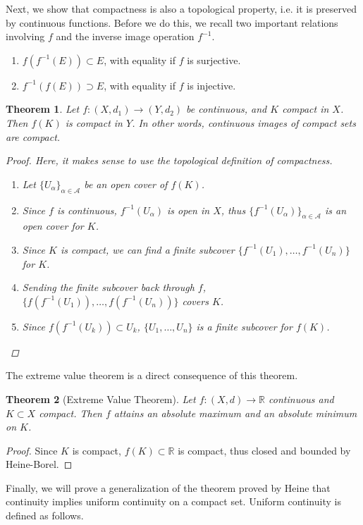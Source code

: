 \documentclass[12pt]{amsart}         %
\newtheorem{theorem}{Theorem}[section]
\theoremstyle{remark}
\newcommand{\R}{\mathbb{R}}
\begin{document}
Next, we show that compactness is also a topological property, i.e. it is preserved by continuous functions. Before we do this, we recall two important relations involving $f$ and the inverse image operation $f^{-1}$.
\begin{enumerate}
    \item $f(f^{-1}(E)) \subset E$, with equality if $f$ is surjective.
    \item $f^{-1}(f(E)) \supset E$, with equality if $f$ is injective.
\end{enumerate}

\begin{theorem}
Let $f: (X, d_1) \rightarrow (Y, d_2)$ be continuous, and $K$ compact in $X$. Then $f(K)$ is compact in $Y$. In other words, continuous images of compact sets are compact.
\begin{proof}
Here, it makes sense to use the topological definition of compactness.
\begin{enumerate}
    \item Let $\{ U_\alpha \}_{\alpha \in \mathcal{A}}$ be an open cover of $f(K)$. \item Since $f$ is continuous, $f^{-1}(U_\alpha)$ is open in $X$, thus $\{ f^{-1}(U_\alpha) \}_{\alpha \in \mathcal{A}}$ is an open cover for $K$. 
    \item Since $K$ is compact, we can find a finite subcover $\{ f^{-1}(U_1), \dots, f^{-1}(U_n) \}$ for $K$. 
    \item Sending the finite subcover back through $f$, $\{ f(f^{-1}(U_1)), \dots, f(f^{-1}(U_n)) \}$ covers $K$.
    \item Since $f(f^{-1}(U_k)) \subset U_k$, $\{ U_1, \dots, U_n \}$ is a finite subcover for $f(K)$.
\end{enumerate}
\end{proof}
\end{theorem}

The extreme value theorem is a direct consequence of this theorem.

\begin{theorem}[Extreme Value Theorem]
Let $f: (X, d) \rightarrow \R$ continuous and $K \subset X$ compact. Then $f$ attains an absolute maximum and an absolute minimum on $K$.  
\end{theorem}
\begin{proof}
Since $K$ is compact, $f(K) \subset \R$ is compact, thus closed and bounded by Heine-Borel.
\end{proof}

Finally, we will prove a generalization of the theorem proved by Heine that continuity implies uniform continuity on a compact set. Uniform continuity is defined as follows.
\end{document}
